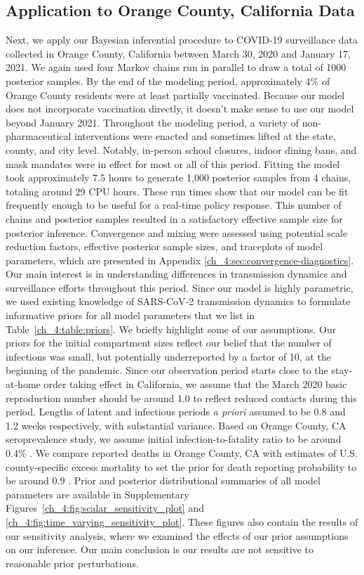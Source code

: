 \subsection{Application to Orange County, California Data}
Next, we apply our Bayesian inferential procedure to COVID-19 surveillance data collected in Orange County, California between March 30, 2020 and January 17, 2021.
We again used four Markov chains run in parallel to draw a total of 1000 posterior samples.
By the end of the modeling period, approximately 4\% of Orange County residents were at least partially vaccinated.
Because our model does not incorporate vaccination directly, it doesn't make sense to use our model beyond January 2021.
Throughout the modeling period, a variety of non-pharmaceutical interventions were enacted and sometimes lifted at the state, county, and city level.
Notably, in-person school closures, indoor dining bans, and mask mandates were in effect for most or all of this period.
Fitting the model took approximately 7.5 hours to generate 1,000 posterior samples from 4 chains, totaling around 29 CPU hours.
These run times show that our model can be fit frequently enough to be useful for a real-time policy response.
This number of chains and posterior samples resulted in a satisfactory effective sample size for posterior inference.
Convergence and mixing were assessed using potential scale reduction factors, effective posterior sample sizes, and traceplots of model parameters, which are presented in Appendix \ref{ch_4:sec:convergence-diagnostics}.
Our main interest is in understanding differences in transmission dynamics and surveillance efforts throughout this period.
Since our model is highly parametric, we used existing knowledge of SARS-CoV-2 transmission dynamics to formulate informative priors for all model parameters that we list in Table~\ref{ch_4:table:priors}.
We briefly highlight some of our assumptions.
Our priors for the initial compartment sizes reflect our belief that the number of infections was small, but potentially underreported by a factor of 10,  at the beginning of the pandemic.
Since our observation period starts close to the stay-at-home order taking effect in California, we assume that the March 2020 basic reproduction number should be around 1.0 to reflect reduced contacts during this period.
Lengths of latent and infectious periods \textit{a priori} assumed to be 0.8 and 1.2 weeks respectively, with substantial variance.
Based on Orange County, CA seroprevalence study, we assume initial infection-to-fatality ratio to be around 0.4\% \citep{Bruckner2021}.
We compare reported deaths in Orange County,  CA with estimates of U.S. county-specific excess mortality to set the prior for death reporting probability to be around 0.9 \citep{stokes2020assessing}.
Prior and posterior distributional summaries of all model parameters are available in Supplementary Figures~\ref{ch_4:fig:scalar_sensitivity_plot} and \ref{ch_4:fig:time_varying_sensitivity_plot}.
These figures also contain the results of our sensitivity analysis, where we examined the effects of our prior assumptions on our inference.
Our main conclusion is our results are not sensitive to reasonable prior perturbations.

